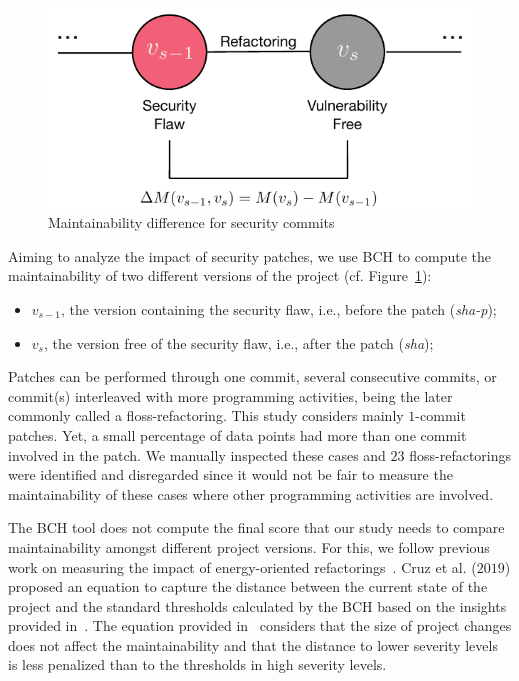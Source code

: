 \documentclass[10pt,conference]{IEEEtran}
\begin{document}
\begin{figure}[h]
 	\centering 	
	\includegraphics[width=0.6\linewidth]{figures/commit.pdf}
 	\caption{Maintainability difference for security commits}
	\label{fig:commit}
\end{figure}

Aiming to analyze the impact of security patches, we use BCH to compute the
maintainability of two different versions of the project (cf. Figure~\ref{fig:commit}):

\begin{itemize}
	\item $v_{s-1}$, the version containing the security flaw, i.e., before the
	patch (\emph{sha-p});
	\item $v_{s}$, the version free of the security flaw, i.e., after the
	patch (\emph{sha});
\end{itemize}

Patches can be performed through one commit, several consecutive commits, or 
commit(s) interleaved with more programming activities, being the later
commonly called a floss-refactoring. This study considers mainly $1$-commit 
patches. Yet, a small percentage of data points had more than one commit 
involved in the patch. We manually inspected these cases and $23$ 
floss-refactorings were identified and disregarded since it would not
be fair to measure the maintainability of these cases where other
programming activities are involved.

The BCH tool does not compute the final score that our study needs to compare
maintainability amongst different project versions. For this, we follow previous 
work on measuring the impact of energy-oriented 
refactorings~\cite{cruz2019energyoriented}. Cruz et al. ($2019$) proposed an 
equation to capture the distance between the current state of the project and
the standard thresholds calculated by the BCH based on the insights provided 
in~\cite{Olivari:2018}. The equation provided in~\cite{cruz2019energyoriented} 
considers that the size of project changes does not affect the maintainability 
and that the distance to lower severity levels is less penalized than to the
thresholds in high severity levels.
\end{document}
